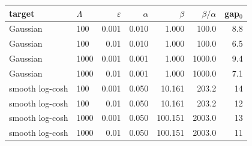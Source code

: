 \begin{tabular}{llrrrrr}
\toprule
target & $\Lambda$ & $\varepsilon$ & $\alpha$ & $\beta$ & $\beta/\alpha$ & gap$_0$ \\
\midrule
Gaussian & 100 & 0.001 & 0.010 & 1.000 & 100.0 & 8.8 \\
Gaussian & 100 & 0.01 & 0.010 & 1.000 & 100.0 & 6.5 \\
Gaussian & 1000 & 0.001 & 0.001 & 1.000 & 1000.0 & 9.4 \\
Gaussian & 1000 & 0.01 & 0.001 & 1.000 & 1000.0 & 7.1 \\
smooth log-cosh & 100 & 0.001 & 0.050 & 10.161 & 203.2 & 14 \\
smooth log-cosh & 100 & 0.01 & 0.050 & 10.161 & 203.2 & 12 \\
smooth log-cosh & 1000 & 0.001 & 0.050 & 100.151 & 2003.0 & 13 \\
smooth log-cosh & 1000 & 0.01 & 0.050 & 100.151 & 2003.0 & 11 \\
\bottomrule
\end{tabular}

